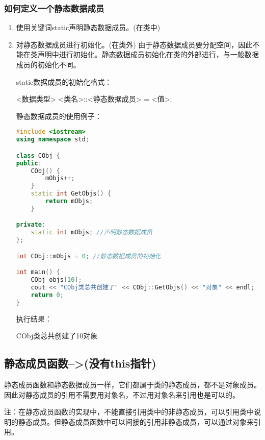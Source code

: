 \documentclass{article}
\begin{document}
\subsubsection{如何定义一个静态数据成员}
\label{sec-6-1-1}
\begin{enumerate}
\item 使用关键词static声明静态数据成员。(在类中)
\label{sec-6-1-1-1}
\item 对静态数据成员进行初始化。(在类外) 由于静态数据成员要分配空间，因此不能在类声明中进行初始化。静态数据成员初始化在类的外部进行，与一般数据成员的初始化不同。
\label{sec-6-1-1-2}

static数据成员的初始化格式：

<数据类型> <类名>::<静态数据成员> = <值>;

静态数据成员的使用例子：
\begin{lstlisting}[language=c++]
#include <iostream>
using namespace std;

class CObj {
public:
    CObj() {    
        mObjs++;
    }
    static int GetObjs() {    
        return mObjs;
    }

private:
    static int mObjs; //声明静态数据成员
};

int CObj::mObjs = 0; //静态数据成员的初始化

int main() {
    CObj objs[10];
    cout << "CObj类总共创建了" << CObj::GetObjs() << "对象" << endl;
    return 0;
}
\end{lstlisting}

执行结果：

CObj类总共创建了10对象
\end{enumerate}
\subsection{静态成员函数-->(没有this指针)}
\label{sec-6-2}

静态成员函数和静态数据成员一样，它们都属于类的静态成员，都不是对象成员。因此对静态成员的引用不需要用对象名，不过用对象名来引用也是可以的。

注：在静态成员函数的实现中，不能直接引用类中的非静态成员，可以引用类中说明的静态成员。但静态成员函数中可以间接的引用非静态成员，可以通过对象来引用。
\end{document}
